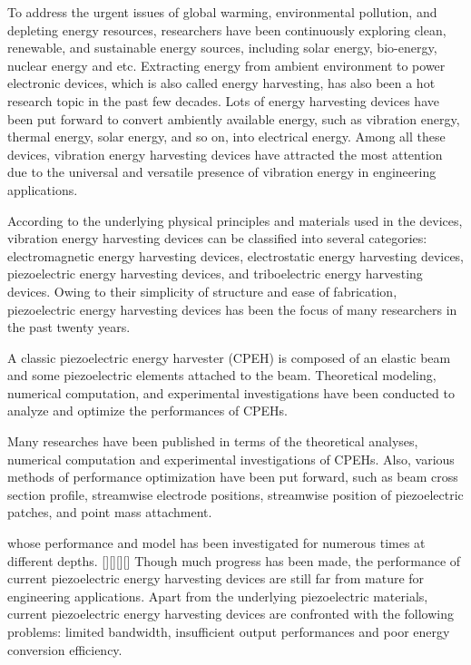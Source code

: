 \documentclass{elsarticle}
\begin{document}
To address the urgent issues of global warming, environmental pollution, and depleting energy resources, researchers have been continuously exploring clean, renewable, and sustainable energy sources, including solar energy, bio-energy, nuclear energy and etc. Extracting energy from ambient environment to power electronic devices, which is also called energy harvesting, has also been a hot research topic in the past few decades. Lots of energy harvesting devices have been put forward to convert ambiently available energy, such as vibration energy, thermal energy, solar energy, and so on, into electrical energy. Among all these devices, vibration energy harvesting devices have attracted the most attention due to the universal and versatile presence of vibration energy in engineering applications.

According to the underlying physical principles and materials used in the devices, vibration energy harvesting devices can be classified into several categories: electromagnetic energy harvesting devices, electrostatic energy harvesting devices, piezoelectric energy harvesting devices, and triboelectric energy harvesting devices. Owing to their simplicity of structure and ease of fabrication, piezoelectric energy harvesting devices has been the focus of many researchers in the past twenty years. 

A classic piezoelectric energy harvester (CPEH) is composed of an elastic beam and some piezoelectric elements attached to the beam. Theoretical modeling, numerical computation, and experimental investigations have been conducted to analyze and optimize the performances of CPEHs. 


Many researches have been published in terms of the theoretical analyses, numerical computation and experimental investigations of CPEHs. Also, various methods of performance optimization have been put forward, such as beam cross section profile, streamwise electrode positions, streamwise position of piezoelectric patches, and point mass attachment. 




whose performance and model has been investigated for numerous times at different depths. [][][][] Though much progress has been made, the performance of current piezoelectric energy harvesting devices are still far from mature for engineering applications. Apart from the underlying piezoelectric materials, current piezoelectric energy harvesting devices are confronted with the following problems: limited bandwidth, insufficient output performances and poor energy conversion efficiency. 
\end{document}
